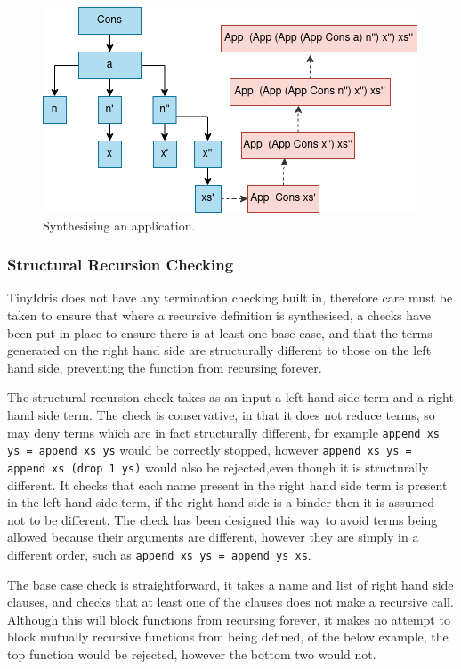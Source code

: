 \documentclass[a4paper]{article}
\begin{document}
\begin{center}
\begin{figure}[htbp]
\centering
\includegraphics[scale=0.5]{./Resource/tis.png}
\caption{Synthesising an application.}
\end{figure}
\end{center}

\subsubsection{Structural Recursion Checking}
\label{sec:orgb4d20b2}
TinyIdris does not have any termination checking built in,
therefore care must be taken to ensure that where a recursive
definition is synthesised, a checks have been put in place to
ensure there is at least one base case, and that the terms
generated on the right hand side are structurally different to those
on the left hand side, preventing the function from recursing forever. 

The structural recursion check takes as an input a
left hand side term and a right hand side term. The check is
conservative, in that it does not reduce terms, so may deny terms
which are in fact structurally different, for example
\texttt{append xs ys = append xs ys} would be correctly stopped, however \texttt{append xs ys = append xs (drop 1 ys)} would also be rejected,even though it is structurally different. It checks that each name
present in the right hand side term is present in the left hand side
term, if the right hand side is a binder then it is assumed not to
be different. The check has been designed this way to avoid terms
being allowed because their arguments are different, however they
are simply in a different order, such as
\texttt{append xs ys = append ys xs}.  	

The base case check is straightforward, it takes a name and list of
right hand side clauses, and checks that at least one of the clauses
does not make a recursive call. Although this will block functions from
recursing forever, it makes no attempt to block mutually recursive
functions from being defined, of the below example, the top function
would be rejected, however the bottom two would not.
\end{document}
